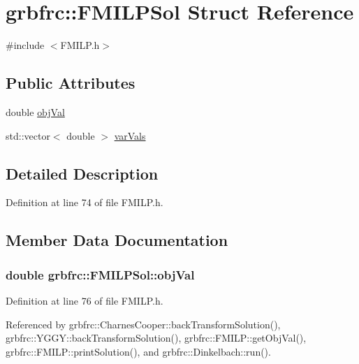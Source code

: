 \hypertarget{structgrbfrc_1_1FMILPSol}{}\section{grbfrc\+:\+:F\+M\+I\+L\+P\+Sol Struct Reference}
\label{structgrbfrc_1_1FMILPSol}


{\ttfamily \#include $<$F\+M\+I\+L\+P.\+h$>$}

\subsection*{Public Attributes}
\begin{DoxyCompactItemize}
\item 
double \hyperlink{structgrbfrc_1_1FMILPSol_a63fec0e4c5df880215f3de25e8605505}{obj\+Val}
\item 
std\+::vector$<$ double $>$ \hyperlink{structgrbfrc_1_1FMILPSol_a36afbb370bb174c488c46b882c0c9bbf}{var\+Vals}
\end{DoxyCompactItemize}


\subsection{Detailed Description}


Definition at line 74 of file F\+M\+I\+L\+P.\+h.



\subsection{Member Data Documentation}
\subsubsection[{\texorpdfstring{obj\+Val}{objVal}}]{\setlength{\rightskip}{0pt plus 5cm}double grbfrc\+::\+F\+M\+I\+L\+P\+Sol\+::obj\+Val}\hypertarget{structgrbfrc_1_1FMILPSol_a63fec0e4c5df880215f3de25e8605505}{}\label{structgrbfrc_1_1FMILPSol_a63fec0e4c5df880215f3de25e8605505}


Definition at line 76 of file F\+M\+I\+L\+P.\+h.



Referenced by grbfrc\+::\+Charnes\+Cooper\+::back\+Transform\+Solution(), grbfrc\+::\+Y\+G\+G\+Y\+::back\+Transform\+Solution(), grbfrc\+::\+F\+M\+I\+L\+P\+::get\+Obj\+Val(), grbfrc\+::\+F\+M\+I\+L\+P\+::print\+Solution(), and grbfrc\+::\+Dinkelbach\+::run().

